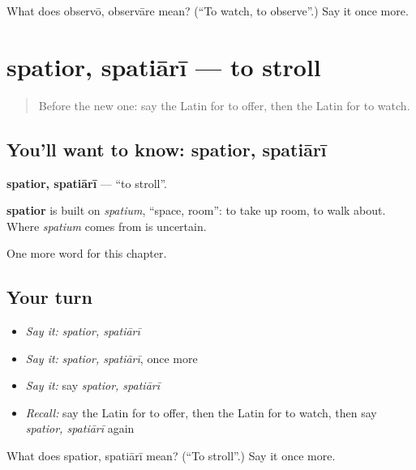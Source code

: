 \begin{tcolorbox}[breakable,colback=teal!4,colframe=teal!35!black,title={Before you move on}]
What does observō, observāre mean? (\textquotedblleft{}To watch, to observe\textquotedblright{}.) Say it once more.
\end{tcolorbox}
\section[spatior, spatiārī]{spatior, spatiārī — to stroll}

\label{lesson:LA-C257-spatior}



\begin{quote}
Before the new one: say the Latin for to offer, then the Latin for to watch.
\end{quote}

\subsection*{You'll want to know: spatior, spatiārī}
\textbf{spatior, spatiārī} — \textquotedblleft{}to stroll\textquotedblright{}.

\begin{cousinweb}
\textbf{spatior} is built on \emph{spatium}, \textquotedblleft{}space, room\textquotedblright{}: to take up room, to walk about. Where \emph{spatium} comes from is uncertain.
\end{cousinweb}

\begin{grammarlens}[title={What you've built}]
One more word for this chapter.
\end{grammarlens}

\subsection*{Your turn}
\begin{itemize}
\raggedright
  \item \emph{Say it:} \emph{spatior, spatiārī}
  \item \emph{Say it:} \emph{spatior, spatiārī}, once more
  \item \emph{Say it:} say \emph{spatior, spatiārī}
  \item \emph{Recall:} say the Latin for to offer, then the Latin for to watch, then say \emph{spatior, spatiārī} again
\end{itemize}

\begin{tcolorbox}[breakable,colback=teal!4,colframe=teal!35!black,title={Before you move on}]
What does spatior, spatiārī mean? (\textquotedblleft{}To stroll\textquotedblright{}.) Say it once more.
\end{tcolorbox}
